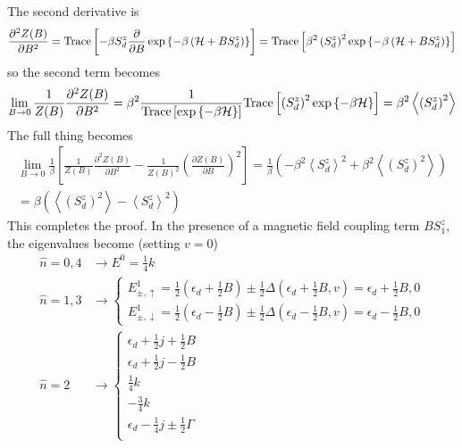 \documentclass[12pt,twoside]{article}
\numberwithin{equation}{section}
\begin{document}
The second derivative is
\begin{equation}\begin{aligned}
	\frac{\partial^2{Z(B)}}{\partial{B^2}} = \text{Trace}\left[-\beta S_d^z  \frac{\partial{}}{\partial{B}}\exp\left\{-\beta \left( \mathcal{H} + BS_d^z \right) \right\}\right] = \text{Trace}\left[\beta^2 \left(S_d^z\right)^2 \exp\left\{-\beta \left( \mathcal{H} + BS_d^z \right) \right\}\right]
\end{aligned}\end{equation}
so the second term becomes
\begin{equation}\begin{aligned}
	\lim_{B \to 0}\frac{1}{Z(B)} \frac{\partial^2{Z(B)}}{\partial{B^2}} = \beta^2 \frac{1}{\text{Trace}\left[\exp\left\{-\beta \mathcal{H}\right\}\right]}\text{Trace}\left[\left(S_d^z\right)^2 \exp\left\{-\beta \mathcal{H}\right\}\right] = \beta^2 \left<\left(S_d^z\right)^2 \right>
\end{aligned}\end{equation}
The full thing becomes
\begin{equation}\begin{aligned}
	\lim_{B \to 0}\frac{1}{\beta}\left[\frac{1}{Z(B)} \frac{\partial^2{Z(B)}}{\partial{B^2}}-\frac{1}{Z(B)^2} \left(\frac{\partial{Z(B)}}{\partial{B}}\right)^2\right] = \frac{1}{\beta}\left(-\beta^2 \left<S_d^z\right>^2 + \beta^2 \left<\left(S_d^z\right)^2 \right>\right) \\
	= \beta \left(\left<\left(S_d^z\right)^2\right> - \left<S_d^z\right>^2\right) 
\end{aligned}\end{equation}
This completes the proof. 
\pb In the presence of a magnetic field coupling term \(B S^z_1\), the eigenvalues become (setting \(v = 0\))
\begin{equation}\begin{aligned}
\hat n=0,4 &\rightarrow E^0 = \frac{1}{4}k\\
\hat n=1,3 &\rightarrow \begin{cases}
	E^1_{\pm, \uparrow} = \frac{1}{2} \left(\epsilon_d + \frac{1}{2}B\right) \pm \frac{1}{2}\Delta\left(\epsilon_d + \frac{1}{2}B, v\right)  = \epsilon_d + \frac{1}{2}B, 0\\ 
	E^1_{\pm, \downarrow} = \frac{1}{2} \left(\epsilon_d - \frac{1}{2}B\right) \pm \frac{1}{2}\Delta\left(\epsilon_d - \frac{1}{2}B, v\right)  = \epsilon_d -\frac{1}{2}B, 0
	\end{cases}\\
	\hat n=2 &\rightarrow \begin{cases}
	\epsilon_d + \frac{1}{2}j + \frac{1}{2}B\\
	\epsilon_d + \frac{1}{2}j - \frac{1}{2}B\\
	\frac{1}{4}k \\
	-\frac{3}{4}k \\
	\epsilon_d -\frac{1}{4}j \pm \frac{1}{2} \Gamma \\
\end{cases}
\end{aligned}\end{equation}
\end{document}
